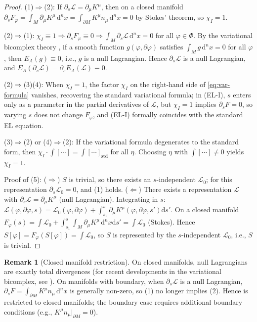 \documentclass[12pt,letterpaper]{article}
\theoremstyle{definition}
\newtheorem{remark}[theorem]{Remark}
\newcommand{\mL}{\mathcal{L}}
\newcommand{\mPhi}{\Phi}
\newcommand{\diff}{\mathrm{d}}
\newcommand{\chiI}{\chi_I}
\newcommand{\dVol}{\,\diff^n x}
\begin{document}
\begin{proof}
(1)$\Rightarrow$(2): If $\partial_s \mL = \partial_\mu K^\mu$, then on a closed manifold $\partial_s F_\varphi = \int_M \partial_\mu K^\mu \dVol = \int_{\partial M} K^\mu n_\mu \dVol = 0$ by Stokes' theorem, so $\chiI = 1$.

(2)$\Rightarrow$(1): $\chiI \equiv 1 \Rightarrow \partial_s F_\varphi \equiv 0 \Rightarrow \int_M \partial_s \mL \dVol = 0$ for all $\varphi \in \mPhi$. By the variational bicomplex theory \cite[Thm 4.7]{Olver1993}, if a smooth function $g(\varphi, \partial\varphi)$ satisfies $\int_M g \dVol = 0$ for all $\varphi$, then $E_A(g) \equiv 0$, i.e., $g$ is a null Lagrangian. Hence $\partial_s \mL$ is a null Lagrangian, and $E_A(\partial_s \mL) = \partial_s E_A(\mL) \equiv 0$.

(2)$\Rightarrow$(3)(4): When $\chiI = 1$, the factor $\chiI$ on the right-hand side of \eqref{eq:var-formula} vanishes, recovering the standard variational formula; in (EL-I), $s$ enters only as a parameter in the partial derivatives of $\mL$, but $\chiI = 1$ implies $\partial_s F = 0$, so varying $s$ does not change $F_\varphi$, and (EL-I) formally coincides with the standard EL equation.

(3)$\Rightarrow$(2) or (4)$\Rightarrow$(2): If the variational formula degenerates to the standard form, then $\chiI \cdot \int[\cdots] = \int[\cdots]_{\mathrm{std}}$ for all $\eta$. Choosing $\eta$ with $\int[\cdots] \neq 0$ yields $\chiI = 1$.

Proof of (5):
($\Rightarrow$) $S$ is trivial, so there exists an $s$-independent $\mL_0$; for this representation $\partial_s \mL_0 = 0$, and (1) holds.
($\Leftarrow$) There exists a representation $\mL$ with $\partial_s \mL = \partial_\mu K^\mu$ (null Lagrangian). Integrating in $s$: $\mL(\varphi, \partial\varphi, s) = \mL_0(\varphi, \partial\varphi) + \int_{s_1}^s \partial_\mu K^\mu(\varphi, \partial\varphi, s') \diff s'$. On a closed manifold $F_\varphi(s) = \int \mL_0 + \int_{s_1}^s \int_M \partial_\mu K^\mu \dVol \diff s' = \int \mL_0$ (Stokes). Hence $S[\varphi] = F_\varphi(S[\varphi]) = \int \mL_0$, so $S$ is represented by the $s$-independent $\mL_0$, i.e., $S$ is trivial.
\end{proof}

\begin{remark}[Closed manifold restriction]
\label{rem:closed-M}
On closed manifolds, null Lagrangians are exactly total divergences \cite{Olver1993} (for recent developments in the variational bicomplex, see \cite{Saunders2024}). On manifolds with boundary, when $\partial_s \mL$ is a null Lagrangian, $\partial_s F = \int_{\partial M} K^\mu n_\mu \dVol$ is generally non-zero, so (1) no longer implies (2). Hence  is restricted to closed manifolds; the boundary case requires additional boundary conditions (e.g., $K^\mu n_\mu|_{\partial M} = 0$).
\end{remark}
\end{document}
